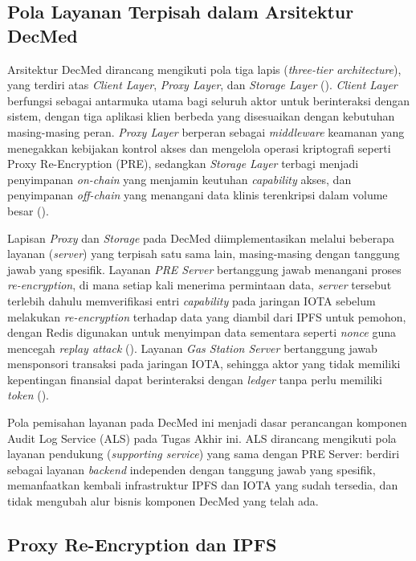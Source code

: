 \subsection{Pola Layanan Terpisah dalam Arsitektur DecMed}
\label{subsec:pola-layanan-decmed}

Arsitektur DecMed dirancang mengikuti pola tiga lapis
(\textit{three-tier architecture}), yang terdiri atas \textit{Client
Layer}, \textit{Proxy Layer}, dan \textit{Storage Layer}
(\cite{DecMed}). \textit{Client Layer} berfungsi sebagai antarmuka
utama bagi seluruh aktor untuk berinteraksi dengan sistem, dengan tiga
aplikasi klien berbeda yang disesuaikan dengan kebutuhan masing-masing
peran. \textit{Proxy Layer} berperan sebagai \textit{middleware}
keamanan yang menegakkan kebijakan kontrol akses dan mengelola operasi
kriptografi seperti Proxy Re-Encryption (PRE), sedangkan
\textit{Storage Layer} terbagi menjadi penyimpanan \textit{on-chain}
yang menjamin keutuhan \textit{capability} akses, dan penyimpanan
\textit{off-chain} yang menangani data klinis terenkripsi dalam volume
besar (\cite{DecMed}).

Lapisan \textit{Proxy} dan \textit{Storage} pada DecMed
diimplementasikan melalui beberapa layanan (\textit{server}) yang
terpisah satu sama lain, masing-masing dengan tanggung jawab yang
spesifik. Layanan \textit{PRE Server} bertanggung jawab menangani
proses \textit{re-encryption}, di mana setiap kali menerima permintaan
data, \textit{server} tersebut terlebih dahulu memverifikasi entri
\textit{capability} pada jaringan IOTA sebelum melakukan
\textit{re-encryption} terhadap data yang diambil dari IPFS untuk
pemohon, dengan Redis digunakan untuk menyimpan data sementara seperti
\textit{nonce} guna mencegah \textit{replay attack} (\cite{DecMed}).
Layanan \textit{Gas Station Server} bertanggung jawab mensponsori
transaksi pada jaringan IOTA, sehingga aktor yang tidak memiliki
kepentingan finansial dapat berinteraksi dengan \textit{ledger} tanpa
perlu memiliki \textit{token} (\cite{DecMed}).

Pola pemisahan layanan pada DecMed ini menjadi dasar perancangan
komponen Audit Log Service (ALS) pada Tugas Akhir ini. ALS dirancang
mengikuti pola layanan pendukung (\textit{supporting service}) yang
sama dengan PRE Server: berdiri sebagai layanan \textit{backend}
independen dengan tanggung jawab yang spesifik, memanfaatkan kembali
infrastruktur IPFS dan IOTA yang sudah tersedia, dan tidak mengubah
alur bisnis komponen DecMed yang telah ada.

\subsection{Proxy Re-Encryption dan IPFS}
\label{subsec:pre-ipfs}

